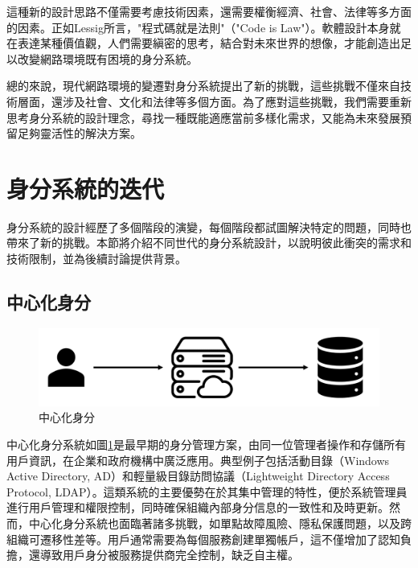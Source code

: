 這種新的設計思路不僅需要考慮技術因素，還需要權衡經濟、社會、法律等多方面的因素。正如Lessig\cite{lessig2000}所言，"程式碼就是法則"（"Code is Law"）。軟體設計本身就在表達某種價值觀，人們需要縝密的思考，結合對未來世界的想像，才能創造出足以改變網路環境既有困境的身分系統。

總的來說，現代網路環境的變遷對身分系統提出了新的挑戰，這些挑戰不僅來自技術層面，還涉及社會、文化和法律等多個方面。為了應對這些挑戰，我們需要重新思考身分系統的設計理念，尋找一種既能適應當前多樣化需求，又能為未來發展預留足夠靈活性的解決方案。
\section{身分系統的迭代}
身分系統的設計經歷了多個階段的演變，每個階段都試圖解決特定的問題，同時也帶來了新的挑戰。本節將介紹不同世代的身分系統設計，以說明彼此衝突的需求和技術限制，並為後續討論提供背景。
\subsection{中心化身分}
\begin{figure}
  \centering
  \includegraphics[width=\linewidth,keepaspectratio]{figures/mid-identity.png}
  \caption{中心化身分}
  \label{fig:mid-identity}
\end{figure}
中心化身分系統如圖\ref{fig:mid-identity}是最早期的身分管理方案，由同一位管理者操作和存儲所有用戶資訊，在企業和政府機構中廣泛應用。典型例子包括活動目錄（Windows Active Directory, AD）和輕量級目錄訪問協議（Lightweight Directory Access Protocol, LDAP）\cite{microsoft2021active, sermersheim2006lightweight}。這類系統的主要優勢在於其集中管理的特性，便於系統管理員進行用戶管理和權限控制，同時確保組織內部身分信息的一致性和及時更新。然而，中心化身分系統也面臨著諸多挑戰，如單點故障風險、隱私保護問題，以及跨組織可遷移性差等。用戶通常需要為每個服務創建單獨帳戶，這不僅增加了認知負擔\cite{josang2007security}，還導致用戶身分被服務提供商完全控制，缺乏自主權。
